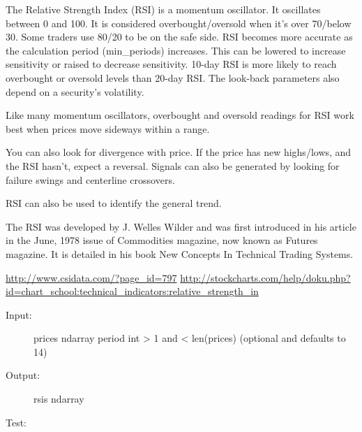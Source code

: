 \documentclass[letterpaper,10pt,english]{sphinxmanual}
\begin{document}
\begin{fulllineitems}
\label{reference:technical_indicators.technical_indicators.rsi}
The Relative Strength Index (RSI) is a momentum oscillator.
It oscillates between 0 and 100.
It is considered overbought/oversold when it's over 70/below 30.
Some traders use 80/20 to be on the safe side.
RSI becomes more accurate as the calculation period (min\_periods)
increases.
This can be lowered to increase sensitivity or raised to decrease
sensitivity.
10-day RSI is more likely to reach overbought or oversold levels than
20-day RSI. The look-back parameters also depend on a security's
volatility.

Like many momentum oscillators, overbought and oversold readings for RSI
work best when prices move sideways within a range.

You can also look for divergence with price.
If the price has new highs/lows, and the RSI hasn't, expect a reversal.
Signals can also be generated by looking for failure swings and centerline
crossovers.

RSI can also be used to identify the general trend.

The RSI was developed by J. Welles Wilder and was first introduced in his
article in the June, 1978 issue of Commodities magazine, now known as
Futures magazine. It is detailed in his book New Concepts In Technical
Trading Systems.

\href{http://www.csidata.com/?page\_id=797}{http://www.csidata.com/?page\_id=797}
\href{http://stockcharts.com/help/doku.php?id=chart\_school:technical\_indicators:relative\_strength\_in}{http://stockcharts.com/help/doku.php?id=chart\_school:technical\_indicators:relative\_strength\_in}
\begin{description}
\item[{Input:}] \leavevmode
prices ndarray
period int \textgreater{} 1 and \textless{} len(prices) (optional and defaults to 14)

\item[{Output:}] \leavevmode
rsis ndarray

\end{description}

Test:


\end{fulllineitems}
\end{document}
